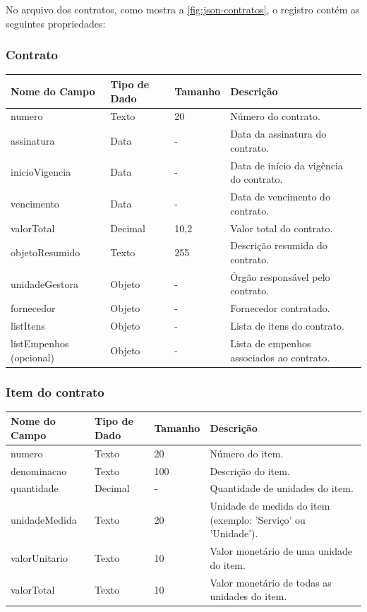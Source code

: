 \documentclass[
	12pt,				%
	oneside,			%
	a4paper,			%
	chapter=TITLE,		%
	section=TITLE,		%
	english,			%
	brazil				%
	]{abntex2}
\begin{document}
\newpage
No arquivo dos contratos, como mostra a \autoref{fig:json-contratos}, o registro contém as seguintes propriedades:

\subsubsection*{Contrato}
\begin{longtable}{|p{4cm}|p{3cm}|p{2cm}|p{6cm}|}
\hline
\textbf{Nome do Campo} & \textbf{Tipo de Dado} & \textbf{Tamanho} & \textbf{Descrição} \\
\hline
numero & Texto & 20 & Número do contrato. \\
\hline
assinatura & Data & - & Data da assinatura do contrato. \\
\hline
inicioVigencia & Data & - & Data de início da vigência do contrato. \\
\hline
vencimento & Data & - & Data de vencimento do contrato. \\
\hline
valorTotal & Decimal & 10,2 & Valor total do contrato. \\
\hline
objetoResumido & Texto & 255 & Descrição resumida do contrato. \\
\hline
unidadeGestora & Objeto & - & Órgão responsável pelo contrato. \\
\hline
fornecedor & Objeto & - & Fornecedor contratado. \\
\hline
listItens & Objeto & - & Lista de itens do contrato. \\
\hline
listEmpenhos (opcional) & Objeto & - & Lista de empenhos associados ao contrato. \\
\hline
\end{longtable}

\newpage
\subsubsection*{Item do contrato}
\begin{longtable}{|p{4cm}|p{3cm}|p{2cm}|p{6cm}|}
\hline
\textbf{Nome do Campo} & \textbf{Tipo de Dado} & \textbf{Tamanho} & \textbf{Descrição} \\
\hline
numero & Texto & 20 & Número do item. \\
\hline
denominacao & Texto & 100 & Descrição do item. \\
\hline
quantidade & Decimal & - & Quantidade de unidades do item. \\
\hline
unidadeMedida & Texto & 20 & Unidade de medida do item (exemplo: 'Serviço' ou 'Unidade'). \\
\hline
valorUnitario & Texto & 10 & Valor monetário de uma unidade do item. \\
\hline
valorTotal & Texto & 10 & Valor monetário de todas as unidades do item. \\
\hline
\end{longtable}
\end{document}
